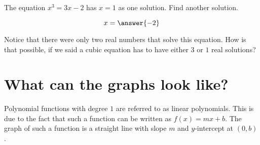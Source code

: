\documentclass{ximera}
\begin{document}
\begin{problem}

	The equation $x^3 = 3x-2$ has $x=1$ as one solution.  Find another solution.
	
	\begin{prompt}
		\[ x= \answer{-2} \]
	\end{prompt}
	\begin{feedback}
  		Notice that there were only two real numbers that solve this equation.  How is that possible, if we said a cubic equation has to have either
		$3$ or $1$ real solutions?
  	\end{feedback}
\end{problem}









\section{What can the graphs look like?}
Polynomial functions with degree $1$ are referred to as linear polynomials.  This is due to the fact
that such a function can be written as $f(x) = mx + b$.  The graph of such a function is a straight line
with slope $m$ and $y$-intercept at $(0,b)$.
\end{document}
